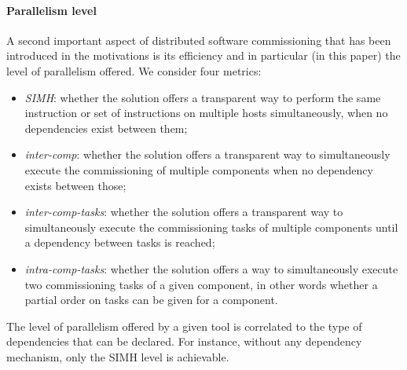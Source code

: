 \paragraph{Parallelism level}
A second important aspect of distributed software commissioning that
has been introduced in the motivations is its efficiency and in
particular (in this paper) the level of parallelism offered. We
consider four metrics:
\begin{itemize}
\item \emph{SIMH}: whether the solution offers a transparent way to
  perform the same instruction or set of instructions on multiple
  hosts simultaneously, when no dependencies exist between them;
\item \emph{inter-comp}: whether the solution offers a transparent way
  to simultaneously execute the commissioning of multiple components
  when no dependency exists between those;
\item \emph{inter-comp-tasks}: whether the solution offers a
  transparent way to simultaneously execute the commissioning tasks of
  multiple components until a dependency between tasks is reached;
\item \emph{intra-comp-tasks}: whether the solution offers a way to
  simultaneously execute two commissioning tasks of a given component,
  in other words whether a partial order on tasks can be given for a
  component.
\end{itemize}
The level of parallelism offered by a given tool is correlated to the
type of dependencies that can be declared. For instance, without any
dependency mechanism, only the SIMH level is achievable.%

